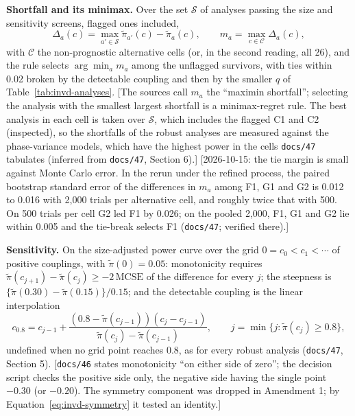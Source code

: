 \documentclass[11pt]{article}
\newcommand{\note}[1]{\textcolor{blue!60!black}{\small [#1]}}
\newcommand{\code}[1]{\texttt{#1}}
\begin{document}
\textbf{Shortfall and its minimax.} Over the set $\mathcal S$ of
analyses passing the size and sensitivity screens, flagged ones
included,
\begin{equation}
\Delta_a(c) = \max_{a' \in \mathcal S}\tilde\pi_{a'}(c) - \tilde\pi_a(c),
\qquad m_a = \max_{c \in \mathcal C}\Delta_a(c),
\label{eq:invd-shortfall}
\end{equation}
with $\mathcal C$ the non-prognostic alternative cells (or, in the
second reading, all 26), and the rule selects $\arg\min_a m_a$ among
the unflagged survivors, with ties within 0.02 broken by the detectable
coupling and then by the smaller $q$ of Table~\ref{tab:invd-analyses}.
\note{The sources call $m_a$ the ``maximin shortfall''; selecting the
analysis with the smallest largest shortfall is a minimax-regret rule.
The best analysis in each cell is taken over $\mathcal S$, which
includes the flagged C1 and C2 (inspected), so the shortfalls of the
robust analyses are measured against the phase-variance models, which
have the highest power in the cells \code{docs/47} tabulates (inferred
from \code{docs/47}, Section 6).}
\note{2026-10-15: the tie margin is small against Monte Carlo error. In
the rerun under the refined process, the paired bootstrap standard
error of the differences in $m_a$ among F1, G1 and G2 is 0.012 to 0.016
with 2,000 trials per alternative cell, and roughly twice that with
500. On 500 trials per cell G2 led F1 by 0.026; on the pooled 2,000,
F1, G1 and G2 lie within 0.005 and the tie-break selects F1
(\code{docs/47}; verified there).}

\textbf{Sensitivity.} On the size-adjusted power curve over the grid
$0 = c_0 < c_1 < \cdots$ of positive couplings, with
$\tilde\pi(0) = 0.05$: monotonicity requires $\tilde\pi(c_{j+1}) -
\tilde\pi(c_j) \ge -2\,\mathrm{MCSE}$ of the difference for every $j$;
the steepness is $\{\tilde\pi(0.30) - \tilde\pi(0.15)\}/0.15$; and the
detectable coupling is the linear interpolation
\begin{equation}
c_{0.8} = c_{j-1} + \frac{(0.8 - \tilde\pi(c_{j-1}))(c_j -
  c_{j-1})}{\tilde\pi(c_j) - \tilde\pi(c_{j-1})},
\qquad j = \min\{j : \tilde\pi(c_j) \ge 0.8\},
\label{eq:invd-detect}
\end{equation}
undefined when no grid point reaches 0.8, as for every robust analysis
(\code{docs/47}, Section 5). \note{\code{docs/46} states monotonicity
``on either side of zero''; the decision script checks the positive
side only, the negative side having the single point $-0.30$ (or
$-0.20$). The symmetry component was dropped in Amendment 1; by
Equation~\eqref{eq:invd-symmetry} it tested an identity.}
\end{document}
